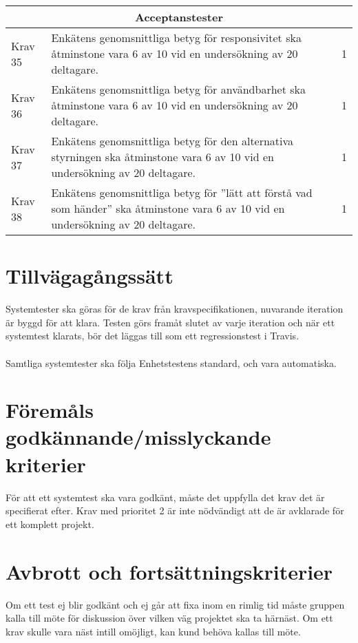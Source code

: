 \documentclass[10pt]{article}
\begin{document}
  \begin{tabular}{| p{2cm} | p{8cm} | p{2cm}|}
	
  \hline
    \multicolumn{3}{|c|}{Acceptanstester}\\
    \hline


		Krav 35& Enkätens\cite {bib-kvalitetsplan} genomsnittliga betyg för responsivitet ska åtminstone vara 6 av 10 vid en undersökning av 20 deltagare. & 1 \\
		\hline
		Krav 36& Enkätens\cite {bib-kvalitetsplan} genomsnittliga betyg för användbarhet ska åtminstone vara 6 av 10 vid en undersökning av 20 deltagare. & 1 \\
		\hline
		Krav 37& Enkätens\cite {bib-kvalitetsplan} genomsnittliga betyg för den alternativa styrningen ska åtminstone vara 6 av 10 vid en undersökning av 20 deltagare. & 1 \\
		\hline
		Krav 38&Enkätens\cite{bib-kvalitetsplan} genomsnittliga betyg för ''lätt att förstå vad som händer'' ska åtminstone vara 6 av 10 vid en undersökning av 20 deltagare. & 1 \\
		\hline

   
  \end{tabular}
  
	
	


\section{Tillvägagångssätt}
	Systemtester ska göras för de krav från kravspecifikationen, nuvarande iteration är byggd för att klara. Testen görs framåt slutet av varje iteration och när ett systemtest klarats, bör det läggas till som ett regressionstest i Travis.\\
	\\
	Samtliga systemtester ska följa Enhetstestens standard, och vara automatiska. 		
	
	
	

\section{Föremåls godkännande/misslyckande kriterier}
	För att ett systemtest ska vara godkänt, måste det uppfylla det krav det är specifierat efter. Krav med prioritet 2 är inte nödvändigt att de är avklarade för ett komplett projekt.\\


\section{Avbrott och fortsättningskriterier}
	Om ett test ej blir godkänt och ej går att fixa inom en rimlig tid måste gruppen kalla till möte för diskussion över vilken väg projektet ska ta härnäst. Om ett krav skulle vara näst intill omöjligt, kan kund behöva kallas till möte.
	
\end{document}
